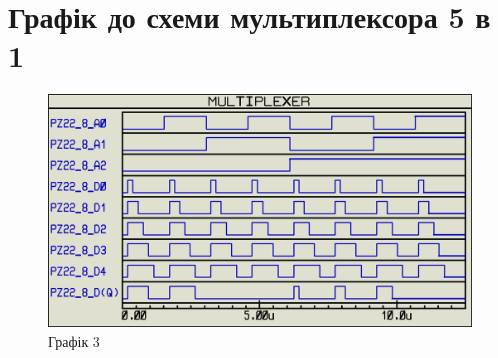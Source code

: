 \documentclass{article}
\begin{document}
\begin{normalsize}
\begin{figure}[H]
		\hspace{5px}
	\end{figure}

	\section*{Графік до схеми мультиплексора 5 в 1}
	\begin{figure}[H]
		\centering
		\includegraphics[scale=0.4]{g3}	
		\caption{Графік 3}
	\end{figure}


\end{normalsize}
\end{document}
